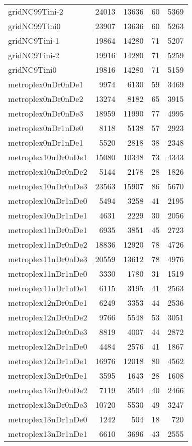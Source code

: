 \begin{longtable}{lrrrr}
gridNC99Tini-2 & 24013 & 13636 & 60 & 5369 \\
gridNC99Tini0 & 23907 & 13636 & 60 & 5263 \\
gridNC9Tini-1 & 19864 & 14280 & 71 & 5207 \\
gridNC9Tini-2 & 19916 & 14280 & 71 & 5259 \\
gridNC9Tini0 & 19816 & 14280 & 71 & 5159 \\
metroplex0nDr0nDe1 & 9974 & 6130 & 59 & 3469 \\
metroplex0nDr0nDe2 & 13274 & 8182 & 65 & 3915 \\
metroplex0nDr0nDe3 & 18959 & 11990 & 77 & 4995 \\
metroplex0nDr1nDe0 & 8118 & 5138 & 57 & 2923 \\
metroplex0nDr1nDe1 & 5520 & 2818 & 38 & 2348 \\
metroplex10nDr0nDe1 & 15080 & 10348 & 73 & 4343 \\
metroplex10nDr0nDe2 & 5144 & 2178 & 28 & 1826 \\
metroplex10nDr0nDe3 & 23563 & 15907 & 86 & 5670 \\
metroplex10nDr1nDe0 & 5494 & 3258 & 41 & 2195 \\
metroplex10nDr1nDe1 & 4631 & 2229 & 30 & 2056 \\
metroplex11nDr0nDe1 & 6935 & 3851 & 45 & 2723 \\
metroplex11nDr0nDe2 & 18836 & 12920 & 78 & 4726 \\
metroplex11nDr0nDe3 & 20559 & 13612 & 78 & 4976 \\
metroplex11nDr1nDe0 & 3330 & 1780 & 31 & 1519 \\
metroplex11nDr1nDe1 & 6115 & 3195 & 41 & 2563 \\
metroplex12nDr0nDe1 & 6249 & 3353 & 44 & 2536 \\
metroplex12nDr0nDe2 & 9766 & 5548 & 53 & 3051 \\
metroplex12nDr0nDe3 & 8819 & 4007 & 44 & 2872 \\
metroplex12nDr1nDe0 & 4484 & 2576 & 41 & 1867 \\
metroplex12nDr1nDe1 & 16976 & 12018 & 80 & 4562 \\
metroplex13nDr0nDe1 & 3595 & 1643 & 28 & 1608 \\
metroplex13nDr0nDe2 & 7119 & 3504 & 40 & 2466 \\
metroplex13nDr0nDe3 & 10720 & 5530 & 49 & 3247 \\
metroplex13nDr1nDe0 & 1242 & 504 & 18 & 720 \\
metroplex13nDr1nDe1 & 6610 & 3696 & 43 & 2555 \\

\end{longtable}
